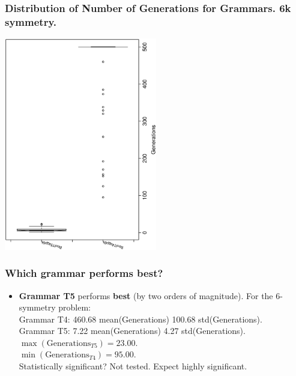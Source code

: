 \documentclass[18pt,c]{beamer}
\makeatletter
\let\beamer@writeslidentry@miniframeson=\beamer@writeslidentry
\newcommand*{\miniframeson}{\let\beamer@writeslidentry=\beamer@writeslidentry@miniframeson}
\makeatother
\begin{document}
 \begin{frame}
 \frametitle{ Distribution of Number of Generations for Grammars. 6k  symmetry. }
 \begin{center}
\includegraphics[width=0.5\textwidth, angle=-90]
{ExpEboxplottGenerations004.eps}
 \end{center}
 \label{ExpEboxplottGenerations004.eps}  
 \end{frame}

\begin{frame}
\frametitle{
Which grammar performs best?
}
\begin{itemize}
\item {\bf Grammar T5} performs {\bf best} (by two orders of magnitude).
        For the 6-symmetry problem:\\
       Grammar T4: 460.68 mean(Generations) 100.68 std(Generations).\\
       Grammar T5: 7.22 mean(Generations)     4.27 std(Generations).\\
       $\max(\mbox{Generations}_{T5})=23.00$. \\
       $\min(\mbox{Generations}_{T4})=95.00$. \\
 
Statistically significant? Not tested. Expect highly significant.
\end{itemize}
\end{frame}%
\miniframeson
\end{document}
